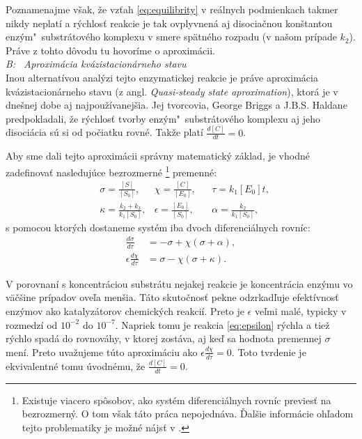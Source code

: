 \documentclass[11pt,final,oneside]{fithesis}
\begin{document}
Poznamenajme v\v sak, \v ze vz\v tah \ref{eq:equilibrity} v re\'alnych podmienkach takmer nikdy neplat\'i a r\'ychlos\v t reakcie je tak ovplyvnen\'a
aj disocia\v cnou kon\v stantou enz\'ym"~substr\'atov\'eho komplexu v smere sp\"atn\'eho rozpadu (v na\v som pr\'ipade $k_2$). Pr\'ave z tohto d\^ ovodu tu
hovor\'ime o aproxim\'acii. \cite{Keener:1998:MP:Enzymes}
\\

\noindent
\textit{B: \ Aproxim\'acia kv\'azistacion\'arneho stavu}
\\

Inou alternat\'ivou anal\'yzi tejto enzymatickej reakcie je pr\'ave aproxim\'acia kv\'azistacion\'arneho stavu 
(z angl. \textit{Quasi-steady state aproximation}), ktor\'a je v dne\v snej dobe aj
najpou\v z\'ivanej\v sia. Jej tvorcovia, George Briggs a J.B.S. Haldane predpokladali, \v ze r\'ychlos\v t tvorby en\-z\'ym"~substr\'atov\'eho komple\-xu 
aj jeho disoci\'acia s\'u si od po\v ciatku rovn\'e. Tak\v ze plat\'i $\frac{d[C]}{dt} = 0$.

Aby sme dali tejto aproxim\'acii spr\'avny matematick\'y z\'aklad, je vhodn\'e zadefinova\v t nasleduj\'uce bezrozmern\'e
\footnote{Existuje viacero sp\^ osobov, ako syst\'em diferenci\'alnych rovn\'ic previes\v t na bezrozmern\'y. O tom v\v sak t\'ato pr\'aca nepojedn\'ava. 
\v Dal\v sie inform\'acie oh\v ladom tejto problematiky je mo\v zn\'e n\'ajs\v t v \cite{Keener:1998:MP:MathBackground}.}
premenn\'e:
\begin{align}
&\sigma = \frac{[S]}{[S_0]}, &\chi = \frac{[C]}{[E_0]},& &\tau = k_1[E_0]t,\nonumber \\
&\kappa = \frac{k_2 + k_3}{k_1[S_0]}, &\epsilon = \frac{[E_0]}{[S_0]},& &\alpha = \frac{k_2}{k_1[S_0]},
\end{align}
s pomocou ktor\'ych dostaneme syst\'em iba dvoch diferenci\'alnych rovn\'ic:
\begin{align}
\frac{d\sigma}{d\tau} &= -\sigma + \chi(\sigma + \alpha),\\
\label{eq:epsilon}
\epsilon\frac{d\chi}{d\tau} &= \sigma - \chi(\sigma + \kappa).
\end{align}

V porovnan\'i s koncentr\'aciou substr\'atu nejakej reakcie je koncentr\'acia enz\'ymu vo v\" a\v c\v sine pr\'ipadov ove\v la men\v sia. T\'ato 
skuto\v cnos\v t pekne odzrkad\v luje efekt\'ivnos\v t enz\'ymov ako katalyz\'atorov chemick\'ych reakci\'i. Preto je $\epsilon$ ve\v lmi mal\'e, typicky 
v rozmedz\'i od $10^{-2}$ do $10^{-7}$. Napriek tomu je reakcia \ref{eq:epsilon} r\'ychla a tie\v z r\'ychlo spad\'a do rovnov\'ahy, v ktorej zost\'ava,
aj ke\v d sa hodnota premennej $\sigma$ men\'i. Preto uva\v zujeme t\'uto aproxim\'aciu ako $\epsilon\frac{d\chi}{d\tau} = 0$. Toto tvrdenie je ekvivalentn\'e
tomu \'uvodn\'emu, \v ze $\frac{d[C]}{dt} = 0$.
\end{document}
